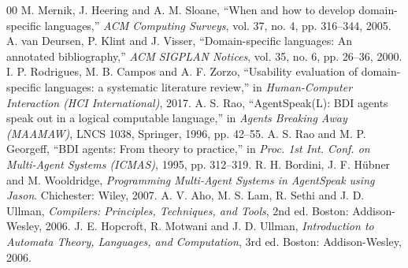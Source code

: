 \documentclass[conference]{IEEEtran}
\begin{document}
\begin{thebibliography}{00}
 M. Mernik, J. Heering and A. M. Sloane, ``When and how to develop domain-specific languages,'' \textit{ACM Computing Surveys}, vol. 37, no. 4, pp. 316--344, 2005.
 A. van Deursen, P. Klint and J. Visser, ``Domain-specific languages: An annotated bibliography,'' \textit{ACM SIGPLAN Notices}, vol. 35, no. 6, pp. 26--36, 2000.
 I. P. Rodrigues, M. B. Campos and A. F. Zorzo, ``Usability evaluation of domain-specific languages: a systematic literature review,'' in \textit{Human-Computer Interaction (HCI International)}, 2017.
 A. S. Rao, ``AgentSpeak(L): BDI agents speak out in a logical computable language,'' in \textit{Agents Breaking Away (MAAMAW)}, LNCS 1038, Springer, 1996, pp. 42--55.
 A. S. Rao and M. P. Georgeff, ``BDI agents: From theory to practice,'' in \textit{Proc. 1st Int. Conf. on Multi-Agent Systems (ICMAS)}, 1995, pp. 312--319.
 R. H. Bordini, J. F. Hübner and M. Wooldridge, \textit{Programming Multi-Agent Systems in AgentSpeak using Jason}. Chichester: Wiley, 2007.
 A. V. Aho, M. S. Lam, R. Sethi and J. D. Ullman, \textit{Compilers: Principles, Techniques, and Tools}, 2nd ed. Boston: Addison-Wesley, 2006.
 J. E. Hopcroft, R. Motwani and J. D. Ullman, \textit{Introduction to Automata Theory, Languages, and Computation}, 3rd ed. Boston: Addison-Wesley, 2006.
\end{thebibliography}
\end{document}
